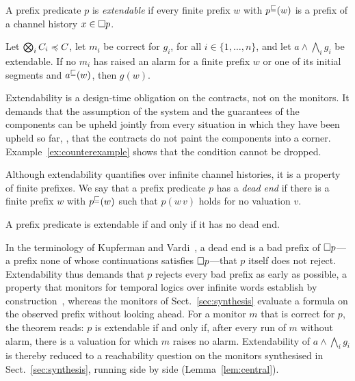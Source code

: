 \begin{definition}[Extendability]\label{def:extendable}
  A prefix predicate $p$ is \emph{extendable} if every finite prefix $w$ with $p^{\sqsubseteq}(w)$ is a prefix of a channel history $x \in \Box p$.
\end{definition}

\begin{theorem}\label{thm:rpm-prefix}
  Let $\bigotimes_i C_i \preccurlyeq C$, let $m_i$ be correct for $g_i$, for all $i \in \{1, \dots, n\}$, and let $a \land \bigwedge_i g_i$ be extendable. If no $m_i$ has raised an alarm for a finite prefix $w$ or one of its initial segments and $a^{\sqsubseteq}(w)$, then $g(w)$.
\end{theorem}

\noindent
Extendability is a design-time obligation on the contracts, not on the monitors. It demands that the assumption of the system and the guarantees of the components can be upheld jointly from every situation in which they have been upheld so far, \ie, that the contracts do not paint the components into a corner. Example~\ref{ex:counterexample} shows that the condition cannot be dropped.

Although extendability quantifies over infinite channel histories, it is a property of finite prefixes. We say that a prefix predicate $p$ has a \emph{dead end} if there is a finite prefix $w$ with $p^{\sqsubseteq}(w)$ such that $p(w\,v)$ holds for no valuation $v$.

\begin{theorem}\label{thm:deadend}
  A prefix predicate is extendable if and only if it has no dead end.
\end{theorem}

\noindent
In the terminology of Kupferman and Vardi~\cite{KupfermanVardi2001}, a dead end is a bad prefix of $\Box p$---a prefix none of whose continuations satisfies $\Box p$---that $p$ itself does not reject. Extendability thus demands that $p$ rejects every bad prefix as early as possible, a property that monitors for temporal logics over infinite words establish by construction~\cite{BauerLeuckerSchallhart2011}, whereas the monitors of Sect.~\ref{sec:synthesis} evaluate a formula on the observed prefix without looking ahead. For a monitor $m$ that is correct for $p$, the theorem reads: $p$ is extendable if and only if, after every run of $m$ without alarm, there is a valuation for which $m$ raises no alarm. Extendability of $a \land \bigwedge_i g_i$ is thereby reduced to a reachability question on the monitors synthesised in Sect.~\ref{sec:synthesis}, running side by side (Lemma~\ref{lem:central}). 

